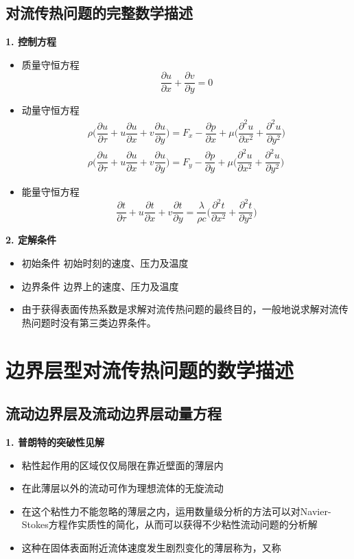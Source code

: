 \subsection{对流传热问题的完整数学描述}
\noindent \textbf{1. 控制方程}
\begin{itemize}
	\item 质量守恒方程
	\begin{equation}
		\dfrac{\partial u}{\partial x} + \dfrac{\partial v}{\partial y}=0
	\end{equation}
	\item 动量守恒方程
	\begin{align}
		\rho \Bigg(\dfrac{\partial u}{\partial \tau} + u\dfrac{\partial u}{\partial x} + v\dfrac{\partial u}{\partial y}\Bigg) = F_x - \dfrac{\partial p}{\partial x} + \mu \Bigg(\dfrac{\partial^2 u }{\partial x^2} + \dfrac{\partial^2 u}{\partial y^2}\Bigg)\\[0.5em]
		\rho \Bigg(\dfrac{\partial u}{\partial \tau} + u\dfrac{\partial u}{\partial x} + v\dfrac{\partial u}{\partial y}\Bigg) = F_y - \dfrac{\partial p}{\partial y} + \mu \Bigg(\dfrac{\partial^2 u }{\partial x^2} + \dfrac{\partial^2 u}{\partial y^2}\Bigg)
	\end{align}
	\item 能量守恒方程
	\begin{equation}
		\dfrac{\partial t}{\partial \tau} + u \dfrac{\partial t}{\partial x} + v \dfrac{\partial t}{\partial y} = \dfrac{\lambda}{\rho c} \Bigg(\dfrac{\partial^2 t}{\partial x^2} + \dfrac{\partial^2 t}{\partial y^2}\Bigg)
	\end{equation}
\end{itemize}

\noindent \textbf{2. 定解条件}
\begin{itemize}
	\item 初始条件 \quad 初始时刻的速度、压力及温度
	\item 边界条件 \quad 边界上的速度、压力及温度
	\item 由于获得表面传热系数是求解对流传热问题的最终目的，一般地说求解对流传热问题时没有第三类边界条件。
\end{itemize}


\section{边界层型对流传热问题的数学描述}
\subsection{流动边界层及流动边界层动量方程}
\noindent \textbf{1. 普朗特的突破性见解}
\begin{itemize}
	\item 粘性起作用的区域仅仅局限在靠近壁面的薄层内
	\item 在此薄层以外的流动可作为理想流体的无旋流动
	\item 在这个粘性力不能忽略的薄层之内，运用数量级分析的方法可以对Navier-Stokes方程作实质性的简化，从而可以获得不少粘性流动问题的分析解
	\item 这种在固体表面附近流体速度发生剧烈变化的薄层称为，又称
	
\end{itemize}

